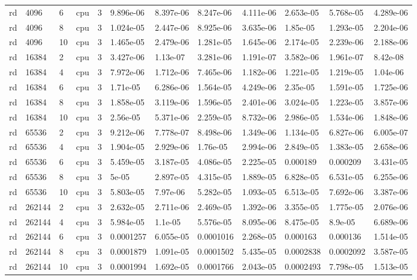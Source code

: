 \begin{tabular}{llllllllllll}
rd & 4096 & 6 & cpu & 3 & 9.896e-06 & 8.397e-06 & 8.247e-06 & 4.111e-06 & 2.653e-05 & 5.768e-05 & 4.289e-06 \\
rd & 4096 & 8 & cpu & 3 & 1.024e-05 & 2.447e-06 & 8.925e-06 & 3.635e-06 & 1.85e-05 & 1.293e-05 & 2.204e-06 \\
rd & 4096 & 10 & cpu & 3 & 1.465e-05 & 2.479e-06 & 1.281e-05 & 1.645e-06 & 2.174e-05 & 2.239e-06 & 2.188e-06 \\
rd & 16384 & 2 & cpu & 3 & 3.427e-06 & 1.13e-07 & 3.281e-06 & 1.191e-07 & 3.582e-06 & 1.961e-07 & 8.42e-08 \\
rd & 16384 & 4 & cpu & 3 & 7.972e-06 & 1.712e-06 & 7.465e-06 & 1.182e-06 & 1.221e-05 & 1.219e-05 & 1.04e-06 \\
rd & 16384 & 6 & cpu & 3 & 1.71e-05 & 6.286e-06 & 1.564e-05 & 4.249e-06 & 2.35e-05 & 1.591e-05 & 1.725e-06 \\
rd & 16384 & 8 & cpu & 3 & 1.858e-05 & 3.119e-06 & 1.596e-05 & 2.401e-06 & 3.024e-05 & 1.223e-05 & 3.857e-06 \\
rd & 16384 & 10 & cpu & 3 & 2.56e-05 & 5.371e-06 & 2.259e-05 & 8.732e-06 & 2.986e-05 & 1.534e-06 & 1.848e-06 \\
rd & 65536 & 2 & cpu & 3 & 9.212e-06 & 7.778e-07 & 8.498e-06 & 1.349e-06 & 1.134e-05 & 6.827e-06 & 6.005e-07 \\
rd & 65536 & 4 & cpu & 3 & 1.904e-05 & 2.929e-06 & 1.76e-05 & 2.994e-06 & 2.849e-05 & 1.383e-05 & 2.658e-06 \\
rd & 65536 & 6 & cpu & 3 & 5.459e-05 & 3.187e-05 & 4.086e-05 & 2.225e-05 & 0.000189 & 0.000209 & 3.431e-05 \\
rd & 65536 & 8 & cpu & 3 & 5e-05 & 2.897e-05 & 4.315e-05 & 1.889e-05 & 6.828e-05 & 6.531e-05 & 6.255e-06 \\
rd & 65536 & 10 & cpu & 3 & 5.803e-05 & 7.97e-06 & 5.282e-05 & 1.093e-05 & 6.513e-05 & 7.692e-06 & 3.387e-06 \\
rd & 262144 & 2 & cpu & 3 & 2.632e-05 & 2.711e-06 & 2.469e-05 & 1.392e-06 & 3.355e-05 & 1.775e-05 & 2.076e-06 \\
rd & 262144 & 4 & cpu & 3 & 5.984e-05 & 1.1e-05 & 5.576e-05 & 8.095e-06 & 8.475e-05 & 8.9e-05 & 6.689e-06 \\
rd & 262144 & 6 & cpu & 3 & 0.0001257 & 6.055e-05 & 0.0001016 & 2.268e-05 & 0.000163 & 0.000136 & 1.514e-05 \\
rd & 262144 & 8 & cpu & 3 & 0.0001879 & 1.091e-05 & 0.0001502 & 5.435e-05 & 0.0002838 & 0.0002092 & 3.587e-05 \\
rd & 262144 & 10 & cpu & 3 & 0.0001994 & 1.692e-05 & 0.0001766 & 2.043e-05 & 0.0002493 & 7.798e-05 & 1.513e-05 \\

\end{tabular}
